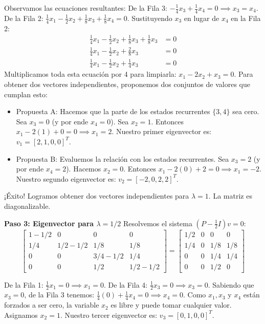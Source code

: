 \documentclass[12pt, a4paper]{article}
\begin{document}
Observamos las ecuaciones resultantes:
De la Fila 3: $-\frac{1}{4}x_3 + \frac{1}{4}x_4 = 0 \implies x_3 = x_4$.
De la Fila 2: $\frac{1}{4}x_1 - \frac{1}{2}x_2 + \frac{1}{8}x_3 + \frac{1}{8}x_4 = 0$.
Sustituyendo $x_3$ en lugar de $x_4$ en la Fila 2:
\begin{align*}
    \frac{1}{4}x_1 - \frac{1}{2}x_2 + \frac{1}{8}x_3 + \frac{1}{8}x_3 &= 0 \\
    \frac{1}{4}x_1 - \frac{1}{2}x_2 + \frac{2}{8}x_3 &= 0 \\
    \frac{1}{4}x_1 - \frac{1}{2}x_2 + \frac{1}{4}x_3 &= 0
\end{align*}
Multiplicamos toda esta ecuación por 4 para limpiarla: $x_1 - 2x_2 + x_3 = 0$.
Para obtener dos vectores independientes, proponemos dos conjuntos de valores que cumplan esto:
\begin{itemize}
    \item Propuesta A: Hacemos que la parte de los estados recurrentes $\{3,4\}$ sea cero. Sea $x_3 = 0$ (y por ende $x_4 = 0$). Sea $x_2 = 1$. Entonces $x_1 - 2(1) + 0 = 0 \implies x_1 = 2$.
    Nuestro primer eigenvector es: $v_1 = [2, 1, 0, 0]^T$.
    \item Propuesta B: Evaluemos la relación con los estados recurrentes. Sea $x_3 = 2$ (y por ende $x_4 = 2$). Hacemos $x_2 = 0$. Entonces $x_1 - 2(0) + 2 = 0 \implies x_1 = -2$.
    Nuestro segundo eigenvector es: $v_2 = [-2, 0, 2, 2]^T$.
\end{itemize}
¡Éxito! Logramos obtener dos vectores independientes para $\lambda=1$. La matriz es diagonalizable.

\textbf{Paso 3: Eigenvector para $\lambda = 1/2$}
Resolvemos el sistema $(P - \frac{1}{2} I)v = 0$:
$$ \begin{bmatrix} 1-1/2 & 0 & 0 & 0 \\ 1/4 & 1/2-1/2 & 1/8 & 1/8 \\ 0 & 0 & 3/4-1/2 & 1/4 \\ 0 & 0 & 1/2 & 1/2-1/2 \end{bmatrix} = \begin{bmatrix} 1/2 & 0 & 0 & 0 \\ 1/4 & 0 & 1/8 & 1/8 \\ 0 & 0 & 1/4 & 1/4 \\ 0 & 0 & 1/2 & 0 \end{bmatrix} $$

De la Fila 1: $\frac{1}{2}x_1 = 0 \implies x_1 = 0$.
De la Fila 4: $\frac{1}{2}x_3 = 0 \implies x_3 = 0$.
Sabiendo que $x_3=0$, de la Fila 3 tenemos: $\frac{1}{4}(0) + \frac{1}{4}x_4 = 0 \implies x_4 = 0$.
Como $x_1, x_3$ y $x_4$ están forzados a ser cero, la variable $x_2$ es libre y puede tomar cualquier valor. Asignamos $x_2 = 1$.
Nuestro tercer eigenvector es: $v_3 = [0, 1, 0, 0]^T$.
\end{document}

